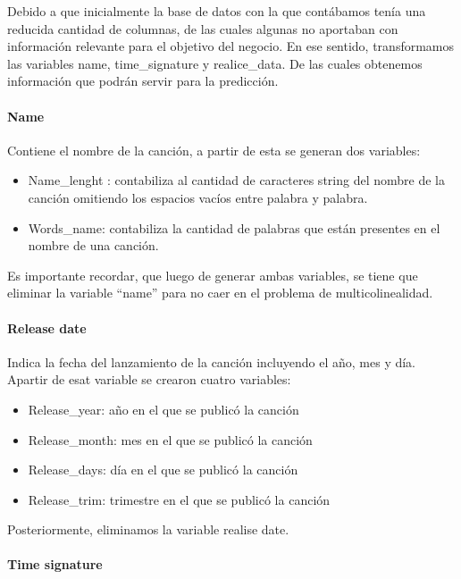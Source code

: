 \documentclass[
  letterpaper,
  DIV=11,
  numbers=noendperiod]{scrartcl}
\providecommand{\tightlist}{%
  \setlength{\itemsep}{0pt}\setlength{\parskip}{0pt}}
\let\oldparagraph\paragraph
\renewcommand{\paragraph}[1]{\oldparagraph{#1}\mbox{}}
\begin{document}
Debido a que inicialmente la base de datos con la que contábamos tenía
una reducida cantidad de columnas, de las cuales algunas no aportaban
con información relevante para el objetivo del negocio. En ese sentido,
transformamos las variables name, time\_signature y realice\_data. De
las cuales obtenemos información que podrán servir para la predicción.

\hypertarget{name}{%
\paragraph{Name}\label{name}}

Contiene el nombre de la canción, a partir de esta se generan dos
variables:

\begin{itemize}
\tightlist
\item
  Name\_lenght : contabiliza al cantidad de caracteres string del nombre
  de la canción omitiendo los espacios vacíos entre palabra y palabra.
\item
  Words\_name: contabiliza la cantidad de palabras que están presentes
  en el nombre de una canción.
\end{itemize}

Es importante recordar, que luego de generar ambas variables, se tiene
que eliminar la variable ``name'' para no caer en el problema de
multicolinealidad.

\hypertarget{release-date}{%
\paragraph{Release date}\label{release-date}}

Indica la fecha del lanzamiento de la canción incluyendo el año, mes y
día. Apartir de esat variable se crearon cuatro variables:

\begin{itemize}
\tightlist
\item
  Release\_year: año en el que se publicó la canción
\item
  Release\_month: mes en el que se publicó la canción
\item
  Release\_days: día en el que se publicó la canción
\item
  Release\_trim: trimestre en el que se publicó la canción
\end{itemize}

Posteriormente, eliminamos la variable realise date.

\hypertarget{time-signature}{%
\paragraph{Time signature}\label{time-signature}}
\end{document}
